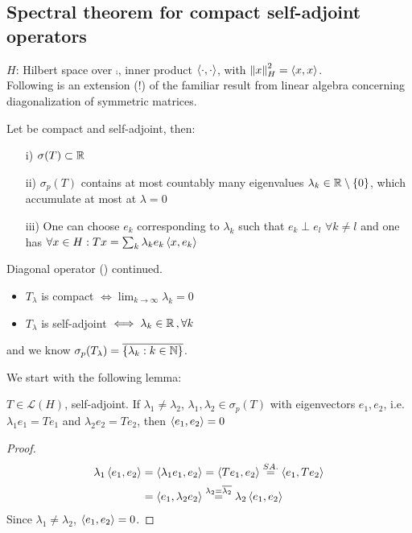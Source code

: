 \documentclass{article}
\begin{document}
\subsection{Spectral theorem for compact self-adjoint operators}
$H$: Hilbert space over $\comp$, inner product $\left<{\cdot},{\cdot}\right>$, with $\left\|{x}\right\|^2_H=\left<{x},{x}\right>$. \\
Following is an extension (!) of the familiar result from linear algebra concerning diagonalization of symmetric matrices.
\begin{theorem}\nl
\label{riesz schauder}
	Let   be compact and self-adjoint, then:
	\begin{itemize}
		\item [i)] $\sigma(T)\subset\mathbb{R}$
		\item [ii)] $\sigma_p(T)$ contains at most countably many eigenvalues $\lambda_k\in\mathbb{R}\setminus\{0\}$, which accumulate at most at $\lambda=0$
		\item [iii)] One can choose $e_k$  corresponding to $\lambda_k$ such that $e_k\perp e_l$ $\forall k\neq l$ and one has $\forall x\in H:Tx=\sum_k \lambda_k e_k\left<{x},{e_k}\right>$
	\end{itemize}
\end{theorem}
\begin{example}\nl
	Diagonal operator ()  continued.\\
	\begin{itemize}
	    \item $T_\lambda$ is compact $\iff \lim_{k\to\infty}\lambda_k=0$
	    \item $T_\lambda$ is self-adjoint $\iff \lambda_k\in\mathbb{R}\,,\forall k$
	\end{itemize}
	 and we know $\sigma_p(T_\lambda)=\overline{\{\lambda_k:k\in\mathbb{N}\}}$.
\end{example}
We start with the following lemma:
\begin{lemma}[Lemma 1]
	$T\in\mathcal{L}(H)$, self-adjoint. If $\lambda_1\neq\lambda_2$, $\lambda_1,\lambda_2\in\sigma_p(T)$ with eigenvectors $e_1,e_2$, i.e. $\lambda_1 e_1=Te_1$ and $\lambda_2e_2=Te_2$, then $\left<{e_1},{e_2}\right>=0$
\end{lemma}
\begin{proof}
   		\begin{equation}
			\begin{split}
			\lambda_1\left<{e_1},{e_2}\right>&=\left<{\lambda_1e_1},{e_2}\right>=\left<{Te_1},{e_2}\right>\stackrel{SA.}{=}\left<{e_1},{Te_2}\right>\\
			&=\left<{e_1},{\lambda_2e_2}\right>\stackrel{\lambda_2=\overline{\lambda_2}}{=}\lambda_2\left<{e_1},{e_2}\right>
			\end{split}
		\end{equation}
		Since $\lambda_1\neq\lambda_2$, $\left<{e_1},{e_2}\right>=0$. 
\end{proof}
\end{document}
